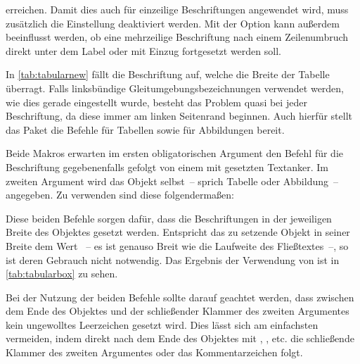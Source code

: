 \documentclass[%
  english,ngerman,%
  geometry=no,DIV=12,automark,%
]{tudscrartcl}
\begin{document}
erreichen. Damit dies auch für einzeilige Beschriftungen angewendet wird, muss 
zusätzlich die Einstellung  deaktiviert werden. Mit der 
Option  kann außerdem beeinflusst werden, ob eine mehrzeilige 
Beschriftung nach einem Zeilenumbruch direkt unter dem Label oder mit Einzug 
fortgesetzt werden soll.
%
\begin{Preamble*}
\captionsetup{singlelinecheck=off,format=hang,justification=raggedright}
\end{Preamble*}
%
In \autoref{tab:tabularnew} fällt die Beschriftung auf, welche die Breite der 
Tabelle überragt. Falls linksbündige Gleitumgebungsbezeichnungen verwendet 
werden, wie dies gerade eingestellt wurde, besteht das Problem quasi bei jeder 
Beschriftung, da diese immer am linken Seitenrand beginnen. Auch hierfür stellt 
das Paket  die Befehle  für Tabellen sowie 
 für Abbildungen bereit. 

Beide Makros erwarten im ersten obligatorischen Argument den Befehl 
 für die Beschriftung gegebenenfalls gefolgt von einem mit 
 gesetzten Textanker. Im zweiten Argument wird das Objekt 
selbst~-- sprich Tabelle oder Abbildung~-- angegeben. Zu verwenden sind diese 
folgendermaßen:
%
%
Diese beiden Befehle sorgen dafür, dass die Beschriftungen in der jeweiligen 
Breite des Objektes gesetzt werden. Entspricht das zu setzende Objekt in seiner 
Breite dem Wert ~-- es ist genauso Breit wie die Laufweite 
des Fließtextes~--, so ist deren Gebrauch nicht notwendig. Das Ergebnis der 
Verwendung von  ist in \autoref{tab:tabularbox} zu sehen.

Bei der Nutzung der beiden Befehle sollte darauf geachtet werden, dass zwischen 
dem Ende des Objektes und der schließender Klammer des zweiten Argumentes kein 
ungewolltes Leerzeichen gesetzt wird. Dies lässt sich am einfachsten vermeiden, 
indem direkt nach dem Ende des Objektes mit , 
,  etc. die schließende 
Klammer des zweiten Argumentes oder das Kommentarzeichen \PValue{\%} folgt.
\end{document}
